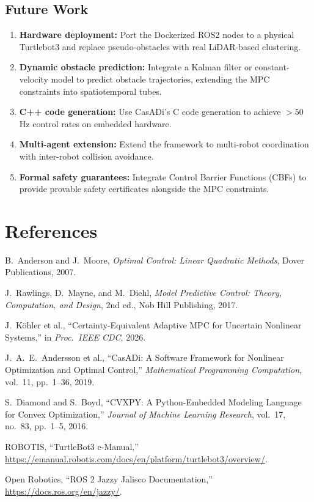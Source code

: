 \documentclass[12pt, a4paper]{article}
\begin{document}
\subsection{Future Work}
\begin{enumerate}
    \item \textbf{Hardware deployment:} Port the Dockerized ROS2 nodes to a physical Turtlebot3 and replace pseudo-obstacles with real LiDAR-based clustering.
    \item \textbf{Dynamic obstacle prediction:} Integrate a Kalman filter or constant-velocity model to predict obstacle trajectories, extending the MPC constraints into spatiotemporal tubes.
    \item \textbf{C++ code generation:} Use CasADi's C code generation to achieve $>50$ Hz control rates on embedded hardware.
    \item \textbf{Multi-agent extension:} Extend the framework to multi-robot coordination with inter-robot collision avoidance.
    \item \textbf{Formal safety guarantees:} Integrate Control Barrier Functions (CBFs) to provide provable safety certificates alongside the MPC constraints.
\end{enumerate}


\section*{References}

\begin{enumerate}[label={[\arabic*]}]
    \item B.\ Anderson and J.\ Moore, \textit{Optimal Control: Linear Quadratic Methods}, Dover Publications, 2007.
    \item J.\ Rawlings, D.\ Mayne, and M.\ Diehl, \textit{Model Predictive Control: Theory, Computation, and Design}, 2nd ed., Nob Hill Publishing, 2017.
    \item J.\ K\"ohler et al., ``Certainty-Equivalent Adaptive MPC for Uncertain Nonlinear Systems,'' in \textit{Proc.\ IEEE CDC}, 2026.
    \item J.\ A.\ E.\ Andersson et al., ``CasADi: A Software Framework for Nonlinear Optimization and Optimal Control,'' \textit{Mathematical Programming Computation}, vol.\ 11, pp.\ 1--36, 2019.
    \item S.\ Diamond and S.\ Boyd, ``CVXPY: A Python-Embedded Modeling Language for Convex Optimization,'' \textit{Journal of Machine Learning Research}, vol.\ 17, no.\ 83, pp.\ 1--5, 2016.
    \item ROBOTIS, ``TurtleBot3 e-Manual,'' \url{https://emanual.robotis.com/docs/en/platform/turtlebot3/overview/}.
    \item Open Robotics, ``ROS 2 Jazzy Jalisco Documentation,'' \url{https://docs.ros.org/en/jazzy/}.
\end{enumerate}
\end{document}
